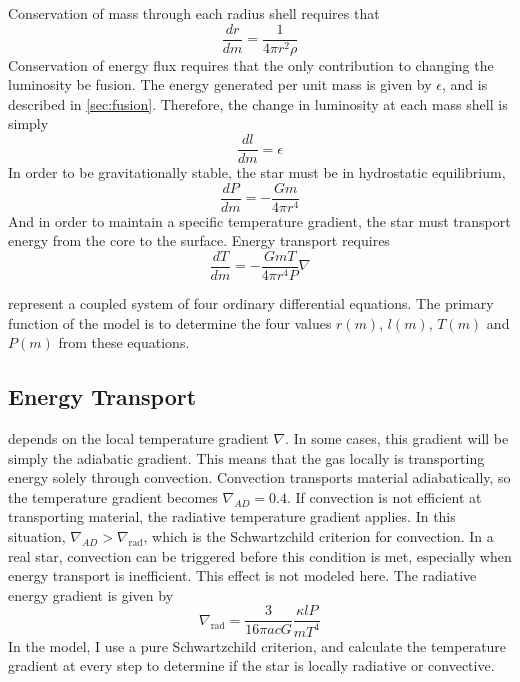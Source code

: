 \documentclass[12pt]{article}
\newcommand{\txt}{\textrm} %
\begin{document}
Conservation of mass through each radius shell requires that
\begin{equation} \label{eqn:consvofmass}
\frac{dr}{dm} = \frac{1}{4\pi r^2 \rho}
\end{equation}
Conservation of energy flux requires that the only contribution to changing the luminosity be fusion. The energy generated per unit mass is given by $\epsilon$, and is described in \cref{sec:fusion}. Therefore, the change in luminosity at each mass shell is simply
\begin{equation}\label{eqn:fusion}
\frac{dl}{dm} = \epsilon
\end{equation}
In order to be gravitationally stable, the star must be in hydrostatic equilibrium,
\begin{equation}\label{eqn:hydrostatic}
\frac{dP}{dm} = -\frac{Gm}{4\pi r^4}
\end{equation}
And in order to maintain a specific temperature gradient, the star must transport energy from the core to the surface. Energy transport requires
\begin{equation}\label{eqn:energytransport}
\frac{dT}{dm} = - \frac{GmT}{4\pi r^4 P} \nabla
\end{equation}

 represent a coupled system of four ordinary differential equations. The primary function of the model is to determine the four values $r(m)$, $l(m)$, $T(m)$ and $P(m)$ from these equations.

\subsection{Energy Transport} \label{sec:energytransport}
 depends on the local temperature gradient $\nabla$. In some cases, this gradient will be simply the adiabatic gradient. This means that the gas locally is transporting energy solely through convection. Convection transports material adiabatically, so the temperature gradient becomes $\nabla_{AD} = 0.4$. If convection is not efficient at transporting material, the radiative temperature gradient applies. In this situation, $\nabla_{AD} > \nabla_\txt{rad}$, which is the Schwartzchild criterion for convection. In a real star, convection can be triggered before this condition is met, especially when energy transport is inefficient. This effect is not modeled here. The radiative energy gradient is given by
\begin{equation}\label{eqn:delrad}
\nabla_\txt{rad} = \frac{3}{16 \pi a c G} \frac{\kappa l P}{ m T^4}
\end{equation}
In the model, I use a pure Schwartzchild criterion, and calculate the temperature gradient at every step to determine if the star is locally radiative or convective.
\end{document}
